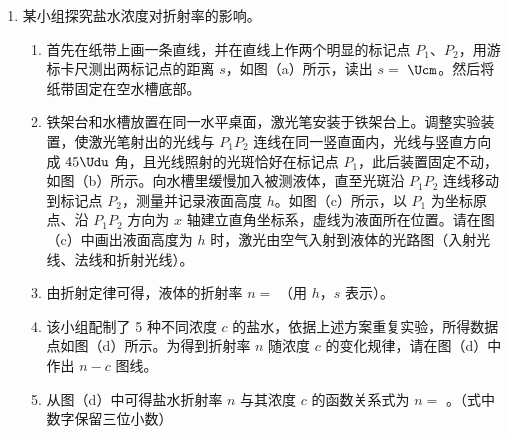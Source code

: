 \documentclass[\gkver]{gaokaozhenti}
\begin{document}
\begin{enumerate}
\item
某小组探究盐水浓度对折射率的影响。
\begin{enumerate}
	\item
	首先在纸带上画一条直线，并在直线上作两个明显的标记点 $P_1$、$P_2$，用游标卡尺测出两标记点的距离 $s$，如图（a）所示，读出 $s=$  $\Ucm$。然后将纸带固定在空水槽底部。
	\item
	铁架台和水槽放置在同一水平桌面，激光笔安装于铁架台上。调整实验装置，使激光笔射出的光线与 $P_1P_2$ 连线在同一竖直面内，光线与竖直方向成 $45\Udu$ 角，且光线照射的光斑恰好在标记点 $P_1$，此后装置固定不动，如图（b）所示。向水槽里缓慢加入被测液体，直至光斑沿 $P_1P_2$ 连线移动到标记点 $P_2$，测量并记录液面高度 $h$。如图（c）所示，以 $P_1$ 为坐标原点、沿 $P_1P_2$ 方向为 $x$ 轴建立直角坐标系，虚线为液面所在位置。请在图（c）中画出液面高度为 $h$ 时，激光由空气入射到液体的光路图（入射光线、法线和折射光线）。
	\item
	由折射定律可得，液体的折射率 $n=$ （用 $h$，$s$ 表示）。
	\item
	该小组配制了 5 种不同浓度 $c$ 的盐水，依据上述方案重复实验，所得数据点如图（d）所示。为得到折射率 $n$ 随浓度 $c$ 的变化规律，请在图（d）中作出 $n-c$ 图线。
	\item
	从图（d）中可得盐水折射率 $n$ 与其浓度 $c$ 的函数关系式为 $n=$ 。（式中数字保留三位小数）
\end{enumerate}
\end{enumerate}
\end{document}
